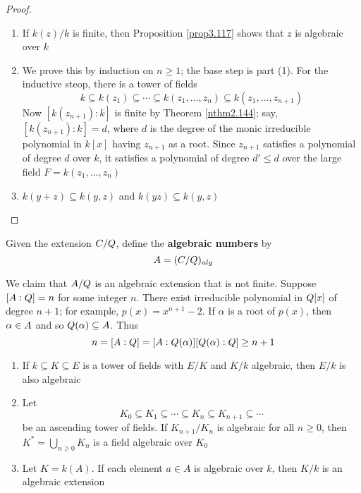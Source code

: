 \documentclass[11pt]{article}
\begin{document}
\begin{proof}
\begin{enumerate}
\item If \(k(z)/k\) is finite, then Proposition \ref{prop3.117} shows that \(z\)
is algebraic over \(k\)
\item We prove this by induction on \(n\ge1\); the base step is part (1). For
the inductive steop, there is a tower of fields
\begin{equation*}
k\subseteq k(z_1)\subseteq \cdots\subseteq k(z_1,\dots,z_n)
\subseteq k(z_1,\dots,z_{n+1})
\end{equation*}
Now \([k(z_{n+1}):k]\) is finite by Theorem \ref{nthm2.144}; say,
\([k(z_{n+1}):k]=d\), where \(d\) is the degree of the monic irreducible
polynomial in \(k[x]\) having \(z_{n+1}\) as a root. Since \(z_{n+1}\)
satisfies a polynomial of degree \(d\) over \(k\), it satisfies a polynomial
of degree \(d'\le d\) over the large field \(F=k(z_1,\dots,z_n)\)
\item \(k(y+z)\subseteq k(y,z)\) and \(k(yz)\subseteq k(y,z)\)
\end{enumerate}
\end{proof}


\begin{definition}[]
Given the extension \(\relax{C}/\relax{Q}\), define the \textbf{algebraic numbers} by
\begin{equation*}
\relax{A}=(\relax{C}/ \relax{Q})_{alg}
\end{equation*}
\end{definition}

\begin{examplle}[]
We claim that \(\relax{A}/\relax{Q}\) is an algebraic extension that is not finite. Suppose 
\([\relax{A}:\relax{Q}]=n\) for some integer \(n\). There exist irreducible polynomial in
\(\relax{Q}[x]\) of degree \(n+1\); for example, \(p(x)=x^{n+1}-2\). If \(\alpha\) is a root
of \(p(x)\), then \(\alpha\in\relax{A}\) and so \(\relax{Q}(\alpha)\subseteq\relax{A}\). Thus
\begin{equation*}
n=[\relax{A}:\relax{Q}]=[\relax{A}:\relax{Q}(\alpha)][\relax{Q}(\alpha):\relax{Q}]\ge n+1
\end{equation*}
\end{examplle}

\begin{lemma}
\label{nlemma5.55}
\begin{enumerate}
\item If \(k\subseteq K\subseteq E\) is a tower of fields with \(E/K\) and \(K/k\)
algebraic, then \(E/k\) is also algebraic
\item Let 
\begin{equation*}
K_0\subseteq K_1\subseteq\cdots\subseteq K_n\subseteq K_{n+1}\subseteq\cdots
\end{equation*}
be an ascending tower of fields. If \(K_{n+1}/K_n\) is algebraic for all
\(n\ge0\), then \(K^*=\bigcup_{n\ge0}K_n\) is a field algebraic over \(K_0\)
\item Let \(K=k(A)\). If each element \(a\in A\) is algebraic over \(k\), then
\(K/k\) is an algebraic extension
\end{enumerate}
\end{lemma}
\end{document}
